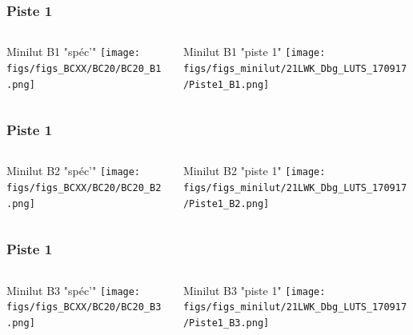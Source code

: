 \documentclass[8pt]{beamer}
\begin{document}
\begin{frame}
\frametitle{Piste 1}
	\begin{columns}
		\begin{column}{0.5\textwidth}
			\begin{center}
				Minilut B1 "spéc'"
		     	\texttt{[image: figs/figs\_BCXX/BC20/BC20\_B1.png]}
		    \end{center}		
		    
		\end{column}
		\begin{column}{0.5\textwidth}
			\begin{center}
				Minilut B1 "piste 1"	
				\texttt{[image: figs/figs\_minilut/21LWK\_Dbg\_LUTS\_170917/Piste1\_B1.png]}
		    \end{center}
		\end{column}
	\end{columns}
\end{frame}

\begin{frame}
\frametitle{Piste 1}
	\begin{columns}
		\begin{column}{0.5\textwidth}
			\begin{center}
				Minilut B2 "spéc'"
		     	\texttt{[image: figs/figs\_BCXX/BC20/BC20\_B2.png]}
		    \end{center}		
		    
		\end{column}
		\begin{column}{0.5\textwidth}
			\begin{center}
				Minilut B2 "piste 1"	
				\texttt{[image: figs/figs\_minilut/21LWK\_Dbg\_LUTS\_170917/Piste1\_B2.png]}
		    \end{center}
		\end{column}
	\end{columns}
\end{frame}

\begin{frame}
\frametitle{Piste 1}
	\begin{columns}
		\begin{column}{0.5\textwidth}
			\begin{center}
				Minilut B3 "spéc'"
		     	\texttt{[image: figs/figs\_BCXX/BC20/BC20\_B3.png]}
		    \end{center}		
		    
		\end{column}
		\begin{column}{0.5\textwidth}
			\begin{center}
				Minilut B3 "piste 1"	
				\texttt{[image: figs/figs\_minilut/21LWK\_Dbg\_LUTS\_170917/Piste1\_B3.png]}
		    \end{center}
		\end{column}
	\end{columns}
\end{frame}
\end{document}
